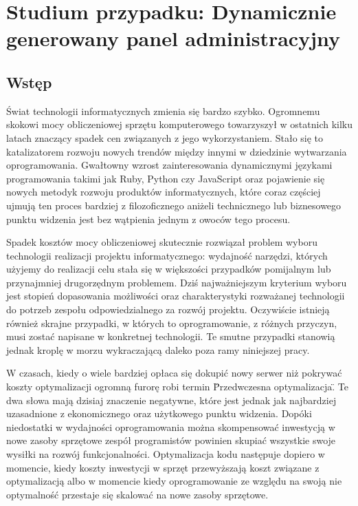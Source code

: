 
\chapter[Studium przypadku: Dynamicznie generowany panel administracyjny]{Studium przypadku: Dynamicznie generowany panel administracyjny}
  \section{Wstęp}
  Świat technologii informatycznych zmienia się bardzo szybko. Ogromnemu skokowi mocy obliczeniowej sprzętu komputerowego towarzyszył w ostatnich kilku latach znaczący spadek cen związanych z jego wykorzystaniem. Stało się to katalizatorem rozwoju nowych trendów między innymi w dziedzinie wytwarzania oprogramowania. Gwałtowny wzrost zainteresowania dynamicznymi językami programowania takimi jak Ruby, Python czy JavaScript oraz pojawienie się nowych metodyk rozwoju produktów informatycznych, które coraz częściej ujmują ten proces bardziej z filozoficznego aniżeli technicznego lub biznesowego punktu widzenia jest bez wątpienia jednym z owoców tego procesu.
  
  Spadek kosztów mocy obliczeniowej skutecznie rozwiązał problem wyboru technologii realizacji projektu informatycznego: wydajność narzędzi, których użyjemy do realizacji celu stała się w większości przypadków pomijalnym lub przynajmniej drugorzędnym problemem. Dziś najważniejszym kryterium wyboru jest stopień dopasowania możliwości oraz charakterystyki rozważanej technologii do potrzeb zespołu odpowiedzialnego za rozwój projektu. Oczywiście istnieją również skrajne przypadki, w których to oprogramowanie, z różnych przyczyn, musi zostać napisane w konkretnej technologii. Te smutne przypadki stanowią jednak kroplę w morzu wykraczającą daleko poza ramy niniejszej pracy.
  
  W czasach, kiedy o wiele bardziej opłaca się dokupić nowy serwer niż pokrywać koszty optymalizacji ogromną furorę robi termin \"Przedwczesna optymalizacja\". Te dwa słowa mają dzisiaj znaczenie negatywne, które jest jednak jak najbardziej uzasadnione z ekonomicznego oraz użytkowego punktu widzenia. Dopóki niedostatki w wydajności oprogramowania można skompensować inwestycją w nowe zasoby sprzętowe zespół programistów powinien skupiać wszystkie swoje wysiłki na rozwój funkcjonalności. Optymalizacja kodu następuje dopiero w momencie, kiedy koszty inwestycji w sprzęt przewyższają koszt związane z optymalizacją albo w momencie kiedy oprogramowanie ze względu na swoją nie optymalność przestaje się skalować na nowe zasoby sprzętowe.
  
